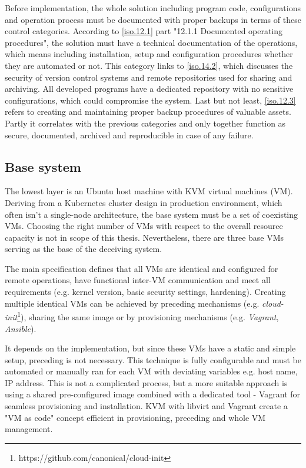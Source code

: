 Before implementation, the whole solution including program code, configurations and operation process must be documented with proper backups in terms of these control categories. According to \ref{iso.12.1} part "12.1.1 Documented operating procedures", the solution must have a technical documentation of the operations, which means including installation, setup and configuration procedures whether they are automated or not. This category links to \ref{iso.14.2}, which discusses the security of version control systems and remote repositories used for sharing and archiving. All developed programs have a dedicated repository with no sensitive configurations, which could compromise the system. Last but not least, \ref{iso.12.3} refers to creating and maintaining proper backup procedures of valuable assets. Partly it correlates with the previous categories and only together function as secure, documented, archived and reproducible in case of any failure.

\subsection{Base system \label{design:env-arch:base}}
The lowest layer is an Ubuntu host machine with KVM virtual machines (VM). Deriving from a Kubernetes cluster design in production environment, which often isn't a single-node architecture, the base system must be a set of coexisting VMs. Choosing the right number of VMs with respect to the overall resource capacity is not in scope of this thesis. Nevertheless, there are three base VMs serving as the base of the deceiving system.

The main specification defines that all VMs are identical and configured for remote operations, have functional inter-VM communication and meet all requirements (e.g. kernel version, basic security settings, hardening). Creating multiple identical VMs can be achieved by preceding mechanisms (e.g. \textit{cloud-init}\footnote{https://github.com/canonical/cloud-init}), sharing the same image or by provisioning mechanisms (e.g. \textit{Vagrant}, \textit{Ansible}).

It depends on the implementation, but since these VMs have a static and simple setup, preceding is not necessary. This technique is fully configurable and must be automated or manually ran for each VM with deviating variables e.g. host name, IP address. This is not a complicated process, but a more suitable approach is using a shared pre-configured image combined with a dedicated tool - Vagrant for seamless provisioning and installation. KVM with libvirt and Vagrant create a "VM as code" concept efficient in provisioning, preceding and whole VM management.

